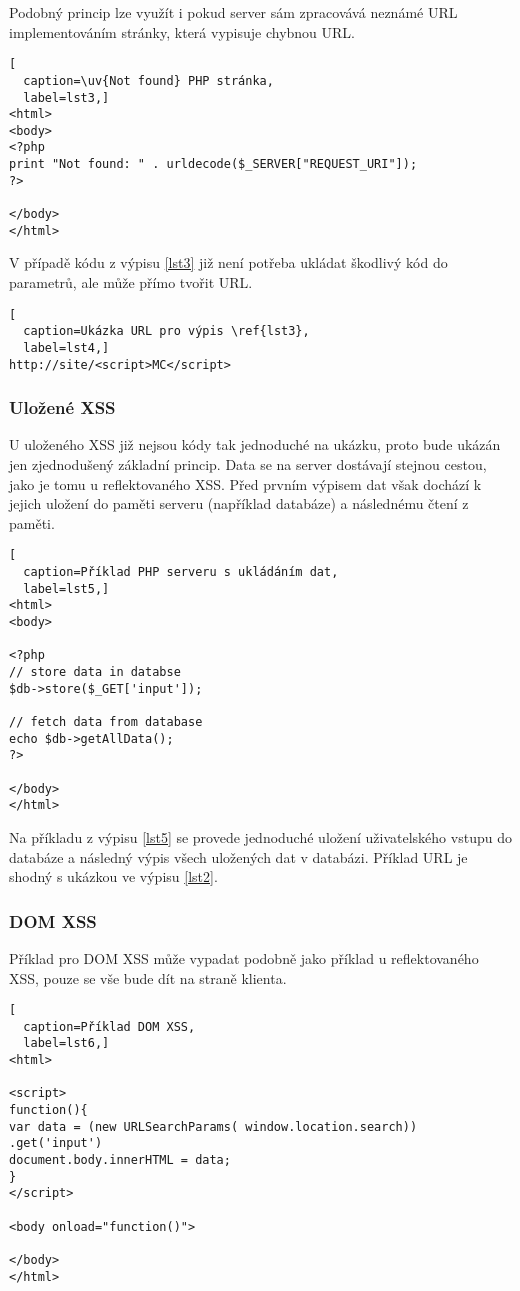 \documentclass[11pt, conference, a4paper]{IEEEtran}
\begin{document}
Podobný princip lze využít i pokud server sám zpracovává neznámé URL implementováním  stránky, která vypisuje chybnou URL.

\begin{lstlisting}[
  caption=\uv{Not found} PHP stránka,
  label=lst3,]
<html>
<body>
<?php
print "Not found: " . urldecode($_SERVER["REQUEST_URI"]);
?>

</body>
</html>
\end{lstlisting}

V případě kódu z výpisu \ref{lst3} již není potřeba ukládat škodlivý kód do parametrů, ale může přímo tvořit URL.

\begin{lstlisting}[
  caption=Ukázka URL pro výpis \ref{lst3},
  label=lst4,]
http://site/<script>MC</script>
\end{lstlisting}

\subsubsection{Uložené XSS}
U uloženého XSS již nejsou kódy tak jednoduché na ukázku, proto bude ukázán jen zjednodušený základní princip. Data se na server dostávají stejnou cestou, jako je tomu u reflektovaného XSS. Před prvním výpisem dat však dochází k jejich uložení do paměti serveru (například databáze) a následnému čtení z paměti.

\begin{lstlisting}[
  caption=Příklad PHP serveru s ukládáním dat,
  label=lst5,]
<html>
<body>

<?php
// store data in databse
$db->store($_GET['input']);

// fetch data from database
echo $db->getAllData();
?>

</body>
</html>
\end{lstlisting}

Na příkladu z výpisu \ref{lst5} se provede jednoduché uložení uživatelského vstupu do databáze a následný výpis všech uložených dat v databázi. Příklad URL je shodný s ukázkou ve výpisu \ref{lst2}.

\subsubsection{DOM XSS}
Příklad pro DOM XSS může vypadat podobně jako příklad u reflektovaného XSS, pouze se vše bude dít na straně klienta. 

\begin{lstlisting}[
  caption=Příklad DOM XSS,
  label=lst6,]
<html>

<script>
function(){
var data = (new URLSearchParams( window.location.search)) .get('input')
document.body.innerHTML = data;
}
</script>

<body onload="function()">

</body>
</html>
\end{lstlisting}
\end{document}
